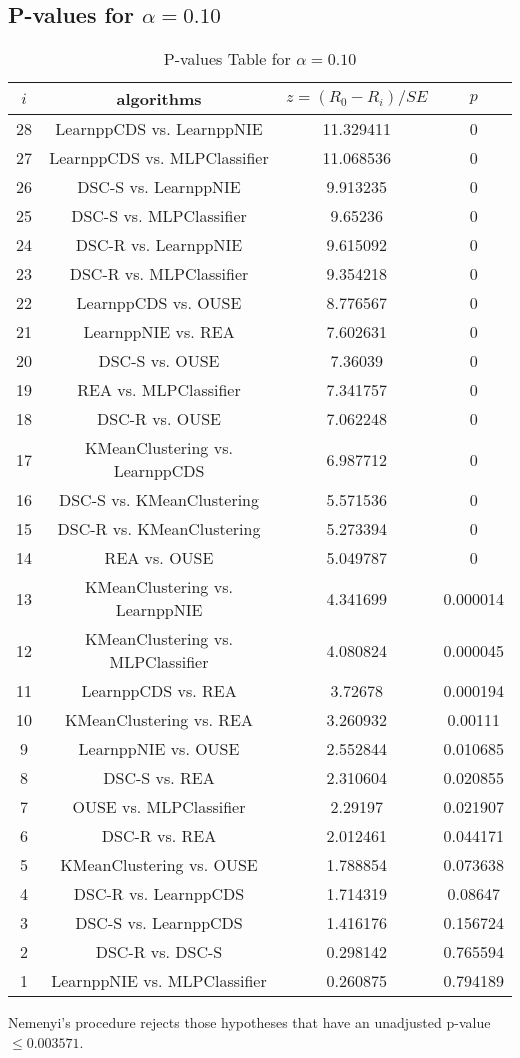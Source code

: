 \documentclass[a4paper,10pt]{article}
\begin{document}
\begin{landscape}
\pagebreak

\subsection{P-values for $\alpha=0.10$}

\begin{table}[!htp]
\centering\scriptsize
\begin{tabular}{cccc}
$i$&algorithms&$z=(R_0 - R_i)/SE$&$p$\\
\hline28&LearnppCDS vs. LearnppNIE&11.329411&0\\
27&LearnppCDS vs. MLPClassifier&11.068536&0\\
26&DSC-S vs. LearnppNIE&9.913235&0\\
25&DSC-S vs. MLPClassifier&9.65236&0\\
24&DSC-R vs. LearnppNIE&9.615092&0\\
23&DSC-R vs. MLPClassifier&9.354218&0\\
22&LearnppCDS vs. OUSE&8.776567&0\\
21&LearnppNIE vs. REA&7.602631&0\\
20&DSC-S vs. OUSE&7.36039&0\\
19&REA vs. MLPClassifier&7.341757&0\\
18&DSC-R vs. OUSE&7.062248&0\\
17&KMeanClustering vs. LearnppCDS&6.987712&0\\
16&DSC-S vs. KMeanClustering&5.571536&0\\
15&DSC-R vs. KMeanClustering&5.273394&0\\
14&REA vs. OUSE&5.049787&0\\
13&KMeanClustering vs. LearnppNIE&4.341699&0.000014\\
12&KMeanClustering vs. MLPClassifier&4.080824&0.000045\\
11&LearnppCDS vs. REA&3.72678&0.000194\\
10&KMeanClustering vs. REA&3.260932&0.00111\\
9&LearnppNIE vs. OUSE&2.552844&0.010685\\
8&DSC-S vs. REA&2.310604&0.020855\\
7&OUSE vs. MLPClassifier&2.29197&0.021907\\
6&DSC-R vs. REA&2.012461&0.044171\\
5&KMeanClustering vs. OUSE&1.788854&0.073638\\
4&DSC-R vs. LearnppCDS&1.714319&0.08647\\
3&DSC-S vs. LearnppCDS&1.416176&0.156724\\
2&DSC-R vs. DSC-S&0.298142&0.765594\\
1&LearnppNIE vs. MLPClassifier&0.260875&0.794189\\
\hline
\end{tabular}
\caption{P-values Table for $\alpha=0.10$}
\end{table}Nemenyi's procedure rejects those hypotheses that have an unadjusted p-value $\le0.003571$.


\end{landscape}
\end{document}
